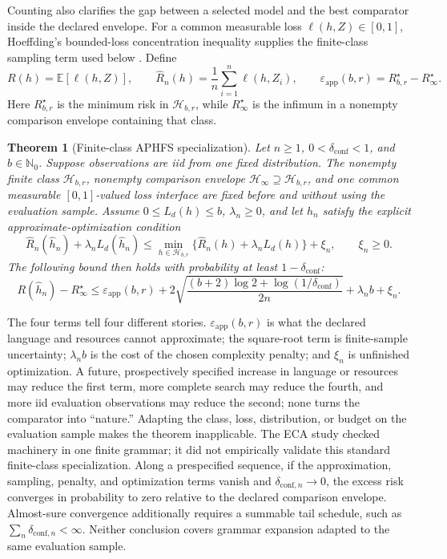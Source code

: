\documentclass[10pt]{article}
\newcommand{\E}{\mathbb{E}}
\newtheorem{theorem}{Theorem}
\theoremstyle{definition}
\begin{document}
Counting also clarifies the gap between a selected model and the best comparator inside the
declared envelope. For a common measurable loss \(\ell(h,Z)\in[0,1]\), Hoeffding's bounded-loss
concentration inequality supplies the finite-class sampling term used below
\citep{hoeffding1963}. Define
\[
R(h)=\E[\ell(h,Z)],\qquad
\widehat R_n(h)=\frac1n\sum_{i=1}^n\ell(h,Z_i),\qquad
\varepsilon_{\mathrm{app}}(b,r)=R_{b,r}^{\star}-R_\infty^{\star}.
\]
Here \(R_{b,r}^{\star}\) is the minimum risk in \(\mathcal H_{b,r}\), while
\(R_\infty^{\star}\) is the infimum in a nonempty comparison envelope containing that class.

\begin{theorem}[Finite-class APHFS specialization]\label{thm:finite}
Let \(n\ge1\), \(0<\delta_{\mathrm{conf}}<1\), and \(b\in\mathbb N_0\). Suppose observations are iid from one
fixed distribution. The nonempty finite class \(\mathcal H_{b,r}\), nonempty comparison envelope
\(\mathcal H_\infty\supseteq\mathcal H_{b,r}\), and one common measurable \([0,1]\)-valued loss
interface are fixed before and without using the evaluation sample. Assume \(0\le L_d(h)\le b\),
\(\lambda_n\ge0\), and let \(\widehat h_n\) satisfy the explicit approximate-optimization condition
\[
\widehat R_n(\widehat h_n)+\lambda_nL_d(\widehat h_n)
\le \min_{h\in\mathcal H_{b,r}}
\{\widehat R_n(h)+\lambda_nL_d(h)\}+\xi_n,
\qquad \xi_n\ge0.
\]
The following bound then holds with probability at least \(1-\delta_{\mathrm{conf}}\):
\begin{equation}
R(\widehat h_n)-R_\infty^\star
\le
\varepsilon_{\mathrm{app}}(b,r)+
2\sqrt{\frac{(b+2)\log2+\log(1/\delta_{\mathrm{conf}})}{2n}}
+\lambda_nb+\xi_n.
\label{eq:oracle}
\end{equation}
\end{theorem}

The four terms tell four different stories. \(\varepsilon_{\mathrm{app}}(b,r)\) is what the declared language and
resources cannot approximate; the square-root term is finite-sample uncertainty; \(\lambda_nb\)
is the cost of the chosen complexity penalty; and \(\xi_n\) is unfinished optimization. A future,
prospectively specified increase in language or resources may reduce the first term, more complete search
may reduce the fourth, and more iid evaluation observations may reduce the second; none turns the
comparator into ``nature.'' Adapting the class, loss, distribution, or budget on the evaluation
sample makes the theorem inapplicable. The ECA study checked machinery in one finite grammar; it
did not empirically validate this standard finite-class specialization. Along a prespecified
sequence, if the approximation, sampling, penalty, and optimization terms vanish and
\(\delta_{\mathrm{conf},n}\to0\), the excess risk converges in probability to zero relative to the
declared comparison envelope. Almost-sure convergence additionally requires a summable tail
schedule, such as \(\sum_n\delta_{\mathrm{conf},n}<\infty\). Neither conclusion covers grammar
expansion adapted to the same evaluation sample.
\end{document}
